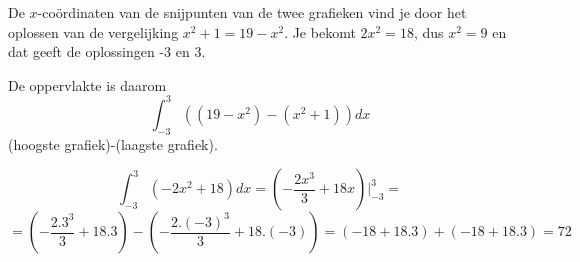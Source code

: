 \documentclass{article}
\begin{document}
\begin{enumerate}
De $x$-co\"ordinaten van de snijpunten van de twee grafieken vind je door het oplossen van de vergelijking $x^2+1=19-x^2$.
Je bekomt $2x^2=18$, dus $x^2=9$ en dat geeft de oplossingen -3 en 3.

De oppervlakte is daarom
\[
\int_{-3}^3 \left(  \left( 19-x^2 \right) - \left( x^2+1 \right)  \right)dx
\]
(hoogste grafiek)-(laagste grafiek).

\[
\int_{-3}^3 \left(  -2x^2+18 \right)dx = \left(   -\frac{2x^3}{3}+18x \right) \vert ^3_{-3}=
\]
\[
=\left( -\frac{2.3^3}{3}+18.3  \right)- \left( -\frac{2.(-3)^3}{3}+18.(-3)  \right)=(-18+18.3)+(-18+18.3)=72
\]

\end{enumerate}
\end{document}
